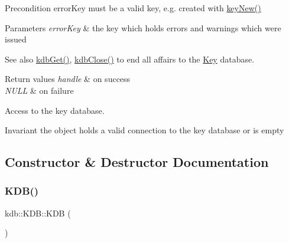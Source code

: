\begin{DoxyPrecond}{Precondition}
error\+Key must be a valid key, e.\+g. created with \hyperlink{group__key_gad23c65b44bf48d773759e1f9a4d43b89}{key\+New()}
\end{DoxyPrecond}

\begin{DoxyParams}{Parameters}
{\em error\+Key} & the key which holds errors and warnings which were issued \\
\hline
\end{DoxyParams}
\begin{DoxySeeAlso}{See also}
\hyperlink{group__kdb_ga28e385fd9cb7ccfe0b2f1ed2f62453a1}{kdb\+Get()}, \hyperlink{group__kdb_gadb54dc9fda17ee07deb9444df745c96f}{kdb\+Close()} to end all affairs to the \hyperlink{group__key}{Key} database. 
\end{DoxySeeAlso}

\begin{DoxyRetVals}{Return values}
{\em handle} & on success \\
\hline
{\em N\+U\+LL} & on failure\\
\hline
\end{DoxyRetVals}
Access to the key database.

\begin{DoxyInvariant}{Invariant}
the object holds a valid connection to the key database or is empty 
\end{DoxyInvariant}


\subsection{Constructor \& Destructor Documentation}
\mbox{\label{classkdb_1_1KDB_a7e0637995ce9f294cdbc6f167df6db40}} 
\subsubsection{\texorpdfstring{K\+D\+B()}{KDB()}\hspace{0.1cm}{\footnotesize\ttfamily [1/2]}}
{\footnotesize\ttfamily kdb\+::\+K\+D\+B\+::\+K\+DB (\begin{DoxyParamCaption}{ }\end{DoxyParamCaption})\hspace{0.3cm}{\ttfamily [inline]}}



